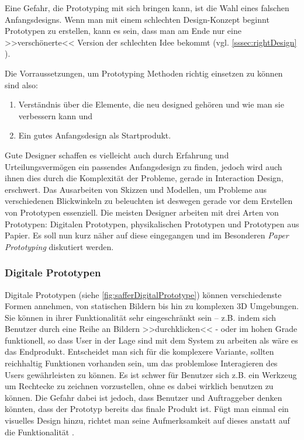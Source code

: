 Eine Gefahr, die Prototyping mit sich bringen kann, ist die Wahl eines falschen Anfangsdesigns. Wenn man mit einem schlechten Design-Konzept beginnt Prototypen zu erstellen, kann es sein, dass man am Ende nur eine >>verschönerte<< Version der schlechten Idee bekommt (vgl. \ref{sssec:rightDesign} ).

Die Vorraussetzungen, um Prototyping Methoden richtig einsetzen zu können sind also:

\begin{enumerate}
	\item Verständnis über die Elemente, die neu designed gehören und wie man sie verbessern kann und
	\item Ein gutes Anfangsdesign als Startprodukt.
\end{enumerate}
\begin{flushright}\citep{Dix:2004}\end{flushright}

Gute Designer schaffen es vielleicht auch durch Erfahrung und Urteilungsvermögen ein passendes Anfangsdesign zu finden, jedoch wird auch ihnen dies durch die Komplexität der Probleme, gerade in Interaction Design, erschwert. Das Ausarbeiten von Skizzen und Modellen, um Probleme aus verschiedenen Blickwinkeln zu beleuchten ist deswegen gerade vor dem Erstellen von Prototypen essenziell.
Die meisten Designer arbeiten mit drei Arten von Prototypen: Digitalen Prototypen, physikalischen Prototypen und Prototypen aus Papier. Es soll nun kurz näher auf diese eingegangen und im Besonderen \emph{Paper Prototyping} diskutiert werden. 

\subsubsection{Digitale Prototypen} 
Digitale Prototypen (siehe \autoref{fig:safferDigitalPrototype}) können verschiedenste Formen annehmen, von statischen Bildern bis hin zu komplexen 3D Umgebungen. Sie können in ihrer Funktionalität sehr eingeschränkt sein – z.B. indem sich Benutzer durch eine Reihe an Bildern >>durchklicken<< - oder im hohen Grade funktionell, so dass User in der Lage sind mit dem System zu arbeiten als wäre es das Endprodukt. Entscheidet man sich für die komplexere Variante, sollten reichhaltig Funktionen vorhanden sein, um das problemlose Interagieren des Users gewährleisten zu können. Es ist schwer für Benutzer sich z.B. ein Werkzeug um Rechtecke zu zeichnen vorzustellen, ohne es dabei wirklich benutzen zu können. Die Gefahr dabei ist jedoch, dass Benutzer und Auftraggeber denken könnten, dass der Prototyp bereits das finale Produkt ist. Fügt man einmal ein visuelles Design hinzu, richtet man seine Aufmerksamkeit auf dieses anstatt auf die Funktionalität \citep{Saffer:2007}.

